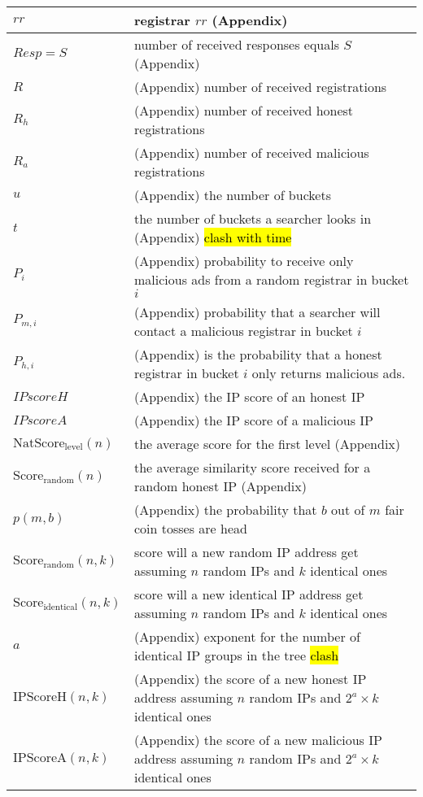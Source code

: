 \begin{table*}
\begin{center}
\begin{tabular}{ | l | p{16cm} |}
        $rr$ & registrar $rr$ (Appendix) \\ \hline
        $Resp = S$ &  number of received responses equals $S$ (Appendix) \\ \hline
        $R$ & (Appendix) number of received registrations \\ \hline
        $R_h$ & (Appendix) number of received honest registrations \\ \hline
        $R_a$ & (Appendix) number of received malicious registrations \\ \hline
        $u$ & (Appendix) the number of buckets \\ \hline
        $t$ & the number of buckets a searcher looks in (Appendix) \hl{clash with time}\\ \hline
        $P_i$ & (Appendix) probability to receive only malicious ads from a random registrar in bucket $i$ \\ \hline
        $P_{m, i}$ & (Appendix) probability that a searcher will contact a malicious registrar in bucket $i$ \\ \hline
        $P_{h, i}$ & (Appendix) is the probability that a honest registrar in bucket $i$ only returns malicious ads. \\ \hline
        $\textit{IPscoreH}$ & (Appendix) the IP score of an honest IP \\ \hline
        $\textit{IPscoreA}$ & (Appendix) the IP score of a malicious IP \\ \hline
        $\text{NatScore}_{\text{level}}(n)$ & the average score for the first level (Appendix) \\ \hline
        $\text{Score}_{\text{random}}(n)$ & the average similarity score received for a random honest IP (Appendix) \\ \hline
        $p(m,b) $ & (Appendix) the probability that $b$ out of $m$ fair coin tosses are head \\ \hline
        $\text{Score}_{\text{random}}(n,k)$ & score will a new random IP address get assuming $n$ random IPs and $k$ identical ones \\ \hline
        $\text{Score}_{\text{identical}}(n,k)$ & score will a new identical IP address get assuming $n$ random IPs and $k$ identical ones \\ \hline
        $a$ & (Appendix) exponent for the number of identical IP groups in the tree \hl{clash}\\ \hline
        $\text{IPScoreH}(n,k)$ & (Appendix) the score of a new honest IP address assuming $n$ random IPs and $2^a \times k$ identical ones \\ \hline
        $\text{IPScoreA}(n,k)$ & (Appendix) the score of a new malicious IP address assuming $n$ random IPs and $2^a \times k$ identical ones \\ \hline
      \hline
    \end{tabular}
  \end{center}
\end{table*}
